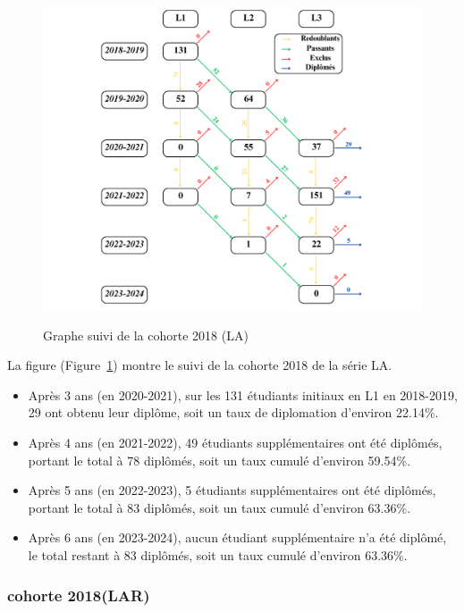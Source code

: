 \begin{figure}[ht]
    \centering
    \caption{Graphe suivi de la cohorte 2018 (LA)}
    \includegraphics[width=1\textwidth]{figure/LA_2018.png}
    \label{fig:cohorte_la_2018}
\end{figure}

La figure (Figure~\ref{fig:cohorte_la_2018}) montre le suivi de la cohorte 2018 de la série LA.
\begin{itemize}
    \item Après 3 ans (en 2020-2021), sur les 131 étudiants initiaux en L1 en 2018-2019, 29 ont obtenu leur diplôme, soit un taux de diplomation d'environ 22.14\%.
    \item Après 4 ans (en 2021-2022), 49 étudiants supplémentaires ont été diplômés, portant le total à 78 diplômés, soit un taux cumulé d'environ 59.54\%.
    \item Après 5 ans (en 2022-2023), 5 étudiants supplémentaires ont été diplômés, portant le total à 83 diplômés, soit un taux cumulé d'environ 63.36\%.
    \item Après 6 ans (en 2023-2024), aucun étudiant supplémentaire n'a été diplômé, le total restant à 83 diplômés, soit un taux cumulé d'environ 63.36\%.
\end{itemize}

\subsubsection{cohorte 2018(LAR)}


